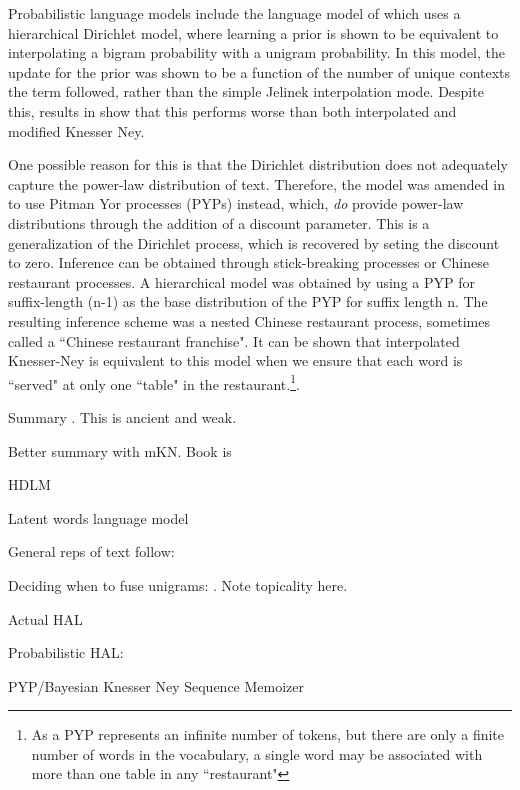 Probabilistic language models include the language model of \cite{MacKay1995} which uses a hierarchical Dirichlet model, where learning a prior is shown to be equivalent to interpolating a bigram probability with a unigram probability. In this model, the update for the prior was shown to be a function of the number of unique contexts the term followed, rather than the simple Jelinek interpolation mode. Despite this, results in \cite{Teh} show that this performs worse than both interpolated and modified Knesser Ney.

One possible reason for this is that the Dirichlet distribution does not adequately capture the power-law distribution of text. Therefore, the model was amended in \cite{Teh} to use Pitman Yor processes (PYPs) instead, which, \emph{do} provide power-law distributions through the addition of a discount parameter. This is a generalization of the Dirichlet process, which is recovered by seting the discount to zero. Inference can be obtained through stick-breaking processes or Chinese restaurant processes. A hierarchical model was obtained by using a PYP for suffix-length (n-1) as the base distribution of the PYP for suffix length n. The resulting inference scheme was a nested Chinese restaurant process, sometimes called a ``Chinese restaurant franchise". It can be shown that interpolated Knesser-Ney is equivalent to this model when we ensure that each word is ``served" at only one ``table" in the restaurant.\footnote{As a PYP represents an infinite number of tokens, but there are only a finite number of words in the vocabulary, a single word may be associated with more than one table in any ``restaurant"}.


Summary \cite{Chen1996}. This is ancient and weak.

Better summary with mKN\cite{Goodman2001}. Book is \cite{Jurafsky2002}

HDLM\cite{MacKay1995}

Latent words language model \cite{Deschacht2012}

General reps of text follow:

Deciding when to fuse unigrams: \cite{Dunning1993}. Note topicality here.

Actual HAL\cite{Lund1996}

Probabilistic HAL: \cite{Azzopardi2005}

PYP/Bayesian Knesser Ney\cite{Teh2002}\cite{Teh}
Sequence Memoizer\cite{Wood2011}




